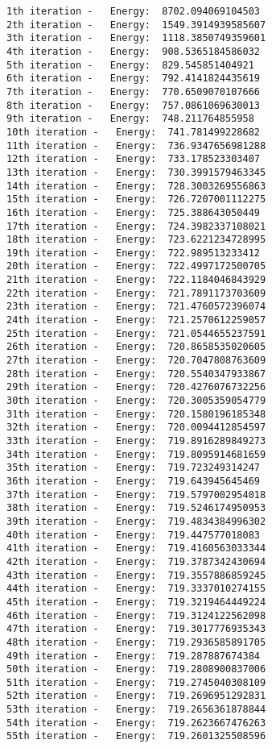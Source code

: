 \documentclass[11pt]{article}
\begin{document}
    \begin{Verbatim}[commandchars=\\\{\}]
1th iteration -   Energy:  8702.094069104503
2th iteration -   Energy:  1549.3914939585607
3th iteration -   Energy:  1118.3850749359601
4th iteration -   Energy:  908.5365184586032
5th iteration -   Energy:  829.545851404921
6th iteration -   Energy:  792.4141824435619
7th iteration -   Energy:  770.6509070107666
8th iteration -   Energy:  757.0861069630013
9th iteration -   Energy:  748.211764855958
10th iteration -   Energy:  741.781499228682
11th iteration -   Energy:  736.9347656981288
12th iteration -   Energy:  733.178523303407
13th iteration -   Energy:  730.3991579463345
14th iteration -   Energy:  728.3003269556863
15th iteration -   Energy:  726.7207001112275
16th iteration -   Energy:  725.388643050449
17th iteration -   Energy:  724.3982337108021
18th iteration -   Energy:  723.6221234728995
19th iteration -   Energy:  722.989513233412
20th iteration -   Energy:  722.4997172500705
21th iteration -   Energy:  722.1184046843929
22th iteration -   Energy:  721.7891173703609
23th iteration -   Energy:  721.4760572396074
24th iteration -   Energy:  721.2570612259057
25th iteration -   Energy:  721.0544655237591
26th iteration -   Energy:  720.8658535020605
27th iteration -   Energy:  720.7047808763609
28th iteration -   Energy:  720.5540347933867
29th iteration -   Energy:  720.4276076732256
30th iteration -   Energy:  720.3005359054779
31th iteration -   Energy:  720.1580196185348
32th iteration -   Energy:  720.0094412854597
33th iteration -   Energy:  719.8916289849273
34th iteration -   Energy:  719.8095914681659
35th iteration -   Energy:  719.723249314247
36th iteration -   Energy:  719.643945645469
37th iteration -   Energy:  719.5797002954018
38th iteration -   Energy:  719.5246174950953
39th iteration -   Energy:  719.4834384996302
40th iteration -   Energy:  719.447577018083
41th iteration -   Energy:  719.4160563033344
42th iteration -   Energy:  719.3787342430694
43th iteration -   Energy:  719.3557886859245
44th iteration -   Energy:  719.3337010274155
45th iteration -   Energy:  719.3219464449224
46th iteration -   Energy:  719.3124122562098
47th iteration -   Energy:  719.3017776935343
48th iteration -   Energy:  719.2936585891705
49th iteration -   Energy:  719.287887674384
50th iteration -   Energy:  719.2808900837006
51th iteration -   Energy:  719.2745040308109
52th iteration -   Energy:  719.2696951292831
53th iteration -   Energy:  719.2656361878844
54th iteration -   Energy:  719.2623667476263
55th iteration -   Energy:  719.2601325508596

\end{Verbatim}
\end{document}
